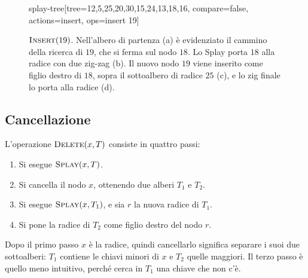 \begin{figure}[htbp]
\begin{widget}{splay-tree}[tree={12,5,25,20,30,15,24,13,18,16}, compare=false, actions={insert}, ops={insert 19}]
\end{widget}
\caption{$\textsc{Insert}(19)$. Nell'albero di partenza (a) è evidenziato il cammino della ricerca di $19$, che si ferma sul nodo $18$. Lo Splay porta $18$ alla radice con due zig-zag (b). Il nuovo nodo $19$ viene inserito come figlio destro di $18$, sopra il sottoalbero di radice $25$ (c), e lo zig finale lo porta alla radice (d).}
\label{fig:insert-19}
\end{figure}

\subsection{Cancellazione}
L'operazione $\textsc{Delete}(x,T)$ consiste in quattro passi:
\begin{enumerate}
    \item Si esegue $\textsc{Splay}(x,T)$.
    \item Si cancella il nodo $x$, ottenendo due alberi $T_1$ e $T_2$.
    \item Si esegue $\textsc{Splay}(x,T_1)$, e sia $r$ la nuova radice di $T_1$.
    \item Si pone la radice di $T_2$ come figlio destro del nodo $r$.
\end{enumerate}
Dopo il primo passo $x$ è la radice, quindi cancellarlo significa separare i suoi due sottoalberi: $T_1$ contiene le chiavi minori di $x$ e $T_2$ quelle maggiori. Il terzo passo è quello meno intuitivo, perché cerca in $T_1$ una chiave che non c'è.

